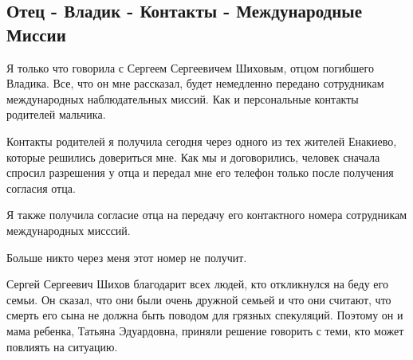  
 
 
 
 

\subsection{Отец - Владик - Контакты - Международные Миссии}
\label{sec:05_04_2021.fb.chelysheva_oxana.1.vladik_donbass}

Я только что говорила с Сергеем Сергеевичем Шиховым, отцом погибшего Владика.
Все, что он мне рассказал, будет немедленно передано сотрудникам международных
наблюдательных миссий. Как и персональные контакты родителей мальчика. 

Контакты родителей я получила сегодня через одного из тех жителей Енакиево,
которые решились довериться мне. Как мы и договорились, человек сначала спросил
разрешения у отца и передал мне его телефон только после получения согласия
отца. 

Я также получила согласие отца на передачу его контактного номера сотрудникам международных мисссий. 

Больше никто через меня этот номер не получит. 

Сергей Сергеевич Шихов благодарит всех людей, кто откликнулся на беду его
семьи. Он сказал, что они были очень дружной семьей и что они считают, что
смерть его сына не должна быть поводом для грязных спекуляций. Поэтому он и
мама ребенка, Татьяна Эдуардовна, приняли решение говорить с теми, кто может
повлиять на ситуацию.
